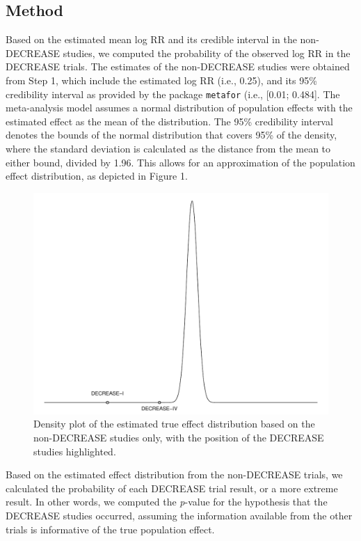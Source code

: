 \documentclass[]{article}
\begin{document}
\subsection{Method}\label{method}

Based on the estimated mean log RR and its credible interval in the
non-DECREASE studies, we computed the probability of the observed log RR
in the DECREASE trials. The estimates of the non-DECREASE studies were
obtained from Step 1, which include the estimated log RR (i.e., 0.25),
and its 95\% credibility interval as provided by the package
\texttt{metafor} (i.e., {[}0.01; 0.484{]}. The meta-analysis model
assumes a normal distribution of population effects with the estimated
effect as the mean of the distribution. The 95\% credibility interval
denotes the bounds of the normal distribution that covers 95\% of the
density, where the standard deviation is calculated as the distance from
the mean to either bound, divided by 1.96. This allows for an
approximation of the population effect distribution, as depicted in
Figure 1.

\begin{figure}

{\centering \includegraphics[width=0.8\linewidth]{../figures/fig1} 

}

\caption{Density plot of the estimated true effect distribution based on the non-DECREASE studies only, with the position of the DECREASE studies highlighted.}\label{fig:figure 1}
\end{figure}

Based on the estimated effect distribution from the non-DECREASE trials,
we calculated the probability of each DECREASE trial result, or a more
extreme result. In other words, we computed the \emph{p}-value for the
hypothesis that the DECREASE studies occurred, assuming the information
available from the other trials is informative of the true population
effect.
\end{document}
